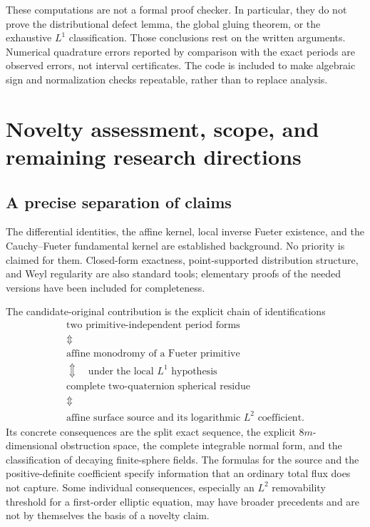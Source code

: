 \documentclass[11pt,a4paper]{article}
\numberwithin{equation}{section}
\theoremstyle{definition}
\theoremstyle{remark}
\begin{document}
These computations are not a formal proof checker. In particular,
they do not prove the distributional defect lemma, the global gluing
theorem, or the exhaustive $L^1$ classification. Those conclusions rest
on the written arguments. Numerical quadrature errors reported by
comparison with the exact periods are observed errors, not interval
certificates. The code is included to make algebraic sign and
normalization checks repeatable, rather than to replace analysis.

\section{Novelty assessment, scope, and remaining research directions}
\label{sec:status}

\subsection{A precise separation of claims}
The differential identities, the affine kernel, local inverse Fueter
existence, and the Cauchy--Fueter fundamental kernel are established
background. No priority is claimed for them. Closed-form exactness,
point-supported distribution structure, and Weyl regularity are also
standard tools; elementary proofs of the needed versions have been
included for completeness.

The candidate-original contribution is the explicit chain of
identifications
\[
 \begin{gathered}
 \text{two primitive-independent period forms}\\
 \Updownarrow\\
 \text{affine monodromy of a Fueter primitive}\\
 \Updownarrow\quad\text{under the local }L^1\text{ hypothesis}\\
 \text{complete two-quaternion spherical residue}\\
 \Updownarrow\\
 \text{affine surface source and its logarithmic }L^2\text{ coefficient}.
 \end{gathered}
\]
Its concrete consequences are the split exact sequence, the explicit
$8m$-dimensional obstruction space, the complete integrable normal form,
and the classification of decaying finite-sphere fields. The formulas
for the source and the positive-definite coefficient specify information
that an ordinary total flux does not capture. Some individual
consequences, especially an $L^2$ removability threshold for a first-order
elliptic equation, may have broader precedents and are not by themselves
the basis of a novelty claim.
\end{document}
